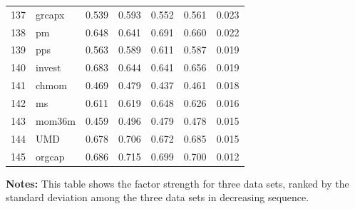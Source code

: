 \documentclass[12pt]{article}
\begin{document}
\begin{footnotesize}
\begin{longtable}{rl|c|c|c|c|c}
		137 & grcapx & 0.539 & 0.593 & 0.552 & 0.561 & 0.023 \\ 
		138 & pm & 0.648 & 0.641 & 0.691 & 0.660 & 0.022 \\ 
		139 & pps & 0.563 & 0.589 & 0.611 & 0.587 & 0.019 \\ 
		140 & invest & 0.683 & 0.644 & 0.641 & 0.656 & 0.019 \\ 
		141 & chmom & 0.469 & 0.479 & 0.437 & 0.461 & 0.018 \\ 
		142 & ms & 0.611 & 0.619 & 0.648 & 0.626 & 0.016 \\ 
		143 & mom36m & 0.459 & 0.496 & 0.479 & 0.478 & 0.015 \\ 
		144 & UMD & 0.678 & 0.706 & 0.672 & 0.685 & 0.015 \\ 
		145 & orgcap & 0.686 & 0.715 & 0.699 & 0.700 & 0.012 \\ 
		\hline
		
	\end{longtable}

			\begin{minipage}{0.97\textwidth}
	{\footnotesize {\bf Notes:} 	This table shows the factor strength for three data sets, ranked by the standard deviation among the three data sets in decreasing sequence.}
\end{minipage}
\end{footnotesize}




\newpage
\end{document}
